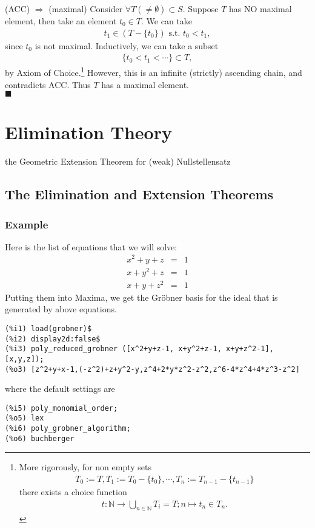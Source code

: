 \documentclass[11pt]{book}
\begin{document}
(ACC) $\Rightarrow$ (maximal)
Consider $\forall T (\neq \emptyset) \subset S$.
Suppose $T$ has NO maximal element, then take an element $t_0 \in T$.
We can take
\begin{eqnarray}
t_1 \in (T - \{t_0\}) \text{ s.t. } t_0 < t_1,
\end{eqnarray}
since $t_0$ is not maximal.
Inductively, we can take a subset
\begin{eqnarray}
\{t_0 < t_1 < \cdots \} \subset T,
\end{eqnarray}
by Axiom of Choice.\footnote{
More rigorously, for non empty sets
\begin{eqnarray}
T_0 := T, T_1 := T_0 - \{t_0\}, \cdots, T_n := T_{n-1}-\{t_{n-1}\}
\end{eqnarray}
there exists a choice function
\begin{eqnarray}
t: \mathbb{N} \to \bigcup_{n \in \mathbb{N}} T_i = T; n \mapsto t_n \in T_n.
\end{eqnarray}

}
However, this is an infinite (strictly) ascending chain, and contradicts ACC.
Thus $T$ has a maximal element.\\
$\blacksquare$


\chapter{Elimination Theory}

the Geometric Extension Theorem for (weak) Nullstellensatz

\section{The Elimination and Extension Theorems}
\setcounter{subsection}{-1}
\subsection{Example}
Here is the list of equations that we will solve:
\begin{eqnarray}
x^2 + y + z &=& 1 \\
x + y^2 + z &=& 1 \\
x + y + z^2 &=& 1
\end{eqnarray}
Putting them into Maxima, we get the Gr\"obner basis for the ideal that is generated by above equations.
\begin{verbatim}
(%i1) load(grobner)$
(%i2) display2d:false$
(%i3) poly_reduced_grobner ([x^2+y+z-1, x+y^2+z-1, x+y+z^2-1],[x,y,z]);
(%o3) [z^2+y+x-1,(-z^2)+z+y^2-y,z^4+2*y*z^2-z^2,z^6-4*z^4+4*z^3-z^2]
\end{verbatim}
where the default settings are
\begin{verbatim}
(%i5) poly_monomial_order;
(%o5) lex
(%i6) poly_grobner_algorithm;
(%o6) buchberger
\end{verbatim}
\end{document}
